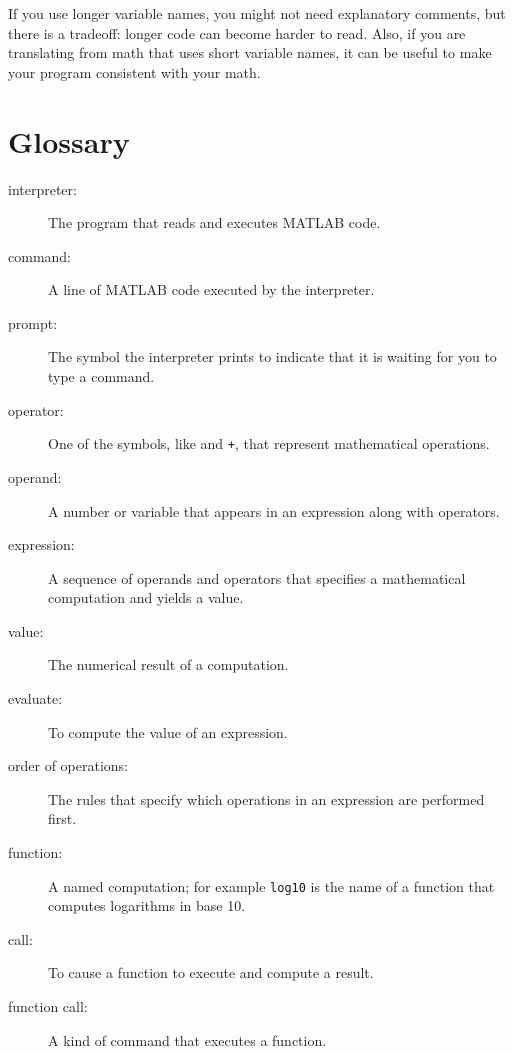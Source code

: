 \documentclass[
]{book}
\begin{document}
If you use longer variable names, you might not need explanatory
comments, but there is a tradeoff: longer code can become harder
to read.  Also, if you are translating from math
that uses short variable names, it can be useful to make your
program consistent with your math.

\section{Glossary}

\begin{description}

\item[interpreter:] The program that reads and executes MATLAB code.

\item[command:] A line of MATLAB code executed by the interpreter.

\item[prompt:] The symbol the interpreter prints to indicate that it is
waiting for you to type a command.

\item[operator:] One of the symbols, like {\tt *} and {\tt +}, that
represent mathematical operations.

\item[operand:] A number or variable that appears in an expression along
with operators.

\item[expression:] A sequence of operands and operators that specifies
a mathematical computation and yields a value.

\item[value:] The numerical result of a computation.

\item[evaluate:] To compute the value of an expression.

\item[order of operations:] The rules that specify which operations
in an expression are performed first.

\item[function:] A named computation; for example {\tt log10} is the
name of a function that computes logarithms in base 10.

\item[call:] To cause a function to execute and compute a result.

\item[function call:] A kind of command that executes a function.


\end{description}
\end{document}
